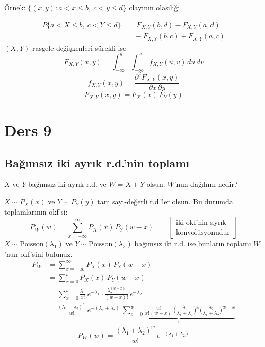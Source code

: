 \documentclass[11pt,a4paper]{article}
\begin{document}
\underline{Örnek:} $\{(x,y): a<x\le b,\ c<y\le d\}$ olayının olasılığı
\begin{center}
\end{center}
\begin{align*}
  P\{a<X\le b,\ c<Y\le d\} &= F_{X,Y}(b,d)-F_{X,Y}(a,d)\\
  &\quad -F_{X,Y}(b,c)+F_{X,Y}(a,c)
\end{align*}
$(X,Y)$ rasgele değişkenleri sürekli ise
\[ F_{X,Y}(x,y)=\int_{-\infty}^{y}\int_{-\infty}^{x}f_{X,Y}(u,v)\,du\,dv \]
\[ f_{X,Y}(x,y)=\frac{\partial^2 F_{X,Y}(x,y)}{\partial x\,\partial y} \]
\[ F_{X,Y}(x,y)=F_X(x)\,F_Y(y) \]

\section{Ders 9}
\subsection{Bağımsız iki ayrık r.d.'nin toplamı}
$X$ ve $Y$ bağımsız iki ayrık r.d. ve $W=X+Y$ olsun. $W$'nun dağılımı nedir?

$X\sim P_X(x)$ ve $Y\sim P_Y(y)$ tam sayı-değerli r.d.'ler olsun. Bu durumda toplamlarının okf'si:
\[ P_W(w)=\sum_{x=-\infty}^{\infty}P_X(x)\,P_Y(w-x) \qquad \left[\begin{array}{l}\text{iki okf'nin ayrık}\\ \text{konvolüsyonudur}\end{array}\right] \]
$X\sim\mathrm{Poisson}(\lambda_1)$ ve $Y\sim\mathrm{Poisson}(\lambda_2)$ bağımsız iki r.d. ise bunların toplamı $W$'nun okf'sini bulunuz.
\begin{align*}
  P_W &= \sum_{x=-\infty}^{\infty}P_X(x)\,P_Y(w-x)\\
      &= \sum_{x=0}^{w}P_X(x)\,P_Y(w-x)\\
      &= \sum_{x=0}^{w}\frac{\lambda_1^{x}}{x!}\,e^{-\lambda_1}\cdot\frac{\lambda_2^{(w-x)}}{(w-x)!}\,e^{-\lambda_2}\\
      &= \frac{(\lambda_1+\lambda_2)^{w}}{w!}\,e^{-(\lambda_1+\lambda_2)}\ \underbrace{\sum_{x=0}^{w}\frac{w!}{x!\,(w-x)!}\Big(\frac{\lambda_1}{\lambda_1+\lambda_2}\Big)^{x}\Big(\frac{\lambda_2}{\lambda_1+\lambda_2}\Big)^{w-x}}_{1}
\end{align*}
\[ P_W(w)=\frac{(\lambda_1+\lambda_2)^{w}}{w!}\,e^{-(\lambda_1+\lambda_2)} \]
\end{document}
